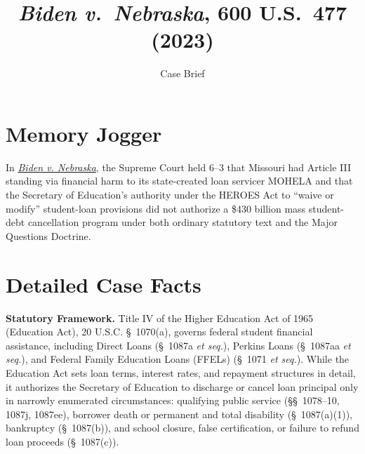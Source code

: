 \documentclass[12pt]{article}
\title{\textit{Biden v.\ Nebraska}, 600 U.S.\ 477 (2023)}
\subtitle{Case Brief}
\author{}
\date{}
\begin{document}
\maketitle

\section{Memory Jogger}

In \href{https://www.law.cornell.edu/supremecourt/text/22-506}{\textit{Biden v. Nebraska}}, the Supreme Court held 6--3 that Missouri had Article III standing via financial harm to its state-created loan servicer MOHELA and that the Secretary of Education's authority under the HEROES Act to ``waive or modify'' student-loan provisions did not authorize a \$430 billion mass student-debt cancellation program under both ordinary statutory text and the Major Questions Doctrine.

\section{Detailed Case Facts}

\textbf{Statutory Framework.} Title IV of the Higher Education Act of 1965 (Education Act), 20 U.S.C. \S~1070(a), governs federal student financial assistance, including Direct Loans (\S~1087a \textit{et seq.}), Perkins Loans (\S~1087aa \textit{et seq.}), and Federal Family Education Loans (FFELs) (\S~1071 \textit{et seq.}). While the Education Act sets loan terms, interest rates, and repayment structures in detail, it authorizes the Secretary of Education to discharge or cancel loan principal only in narrowly enumerated circumstances: qualifying public service (\S\S~1078--10, 1087j, 1087ee), borrower death or permanent and total disability (\S~1087(a)(1)), bankruptcy (\S~1087(b)), and school closure, false certification, or failure to refund loan proceeds (\S~1087(c)).
\end{document}
